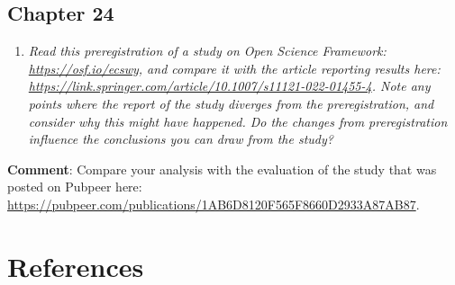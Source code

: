 \documentclass{krantz}
\providecommand{\tightlist}{%
\setlength{\itemsep}{0pt}\setlength{\parskip}{0pt}}
\begin{document}
\hypertarget{chapter-24}{%
\section{Chapter 24}\label{chapter-24}}

\begin{enumerate}
\def\labelenumi{\arabic{enumi}.}
\tightlist
\item
  \emph{Read this preregistration of a study on Open Science Framework: \url{https://osf.io/ecswy}, and compare it with the article reporting results here: \url{https://link.springer.com/article/10.1007/s11121-022-01455-4}. Note any points where the report of the study diverges from the preregistration, and consider why this might have happened. Do the changes from preregistration influence the conclusions you can draw from the study?}
\end{enumerate}

\textbf{Comment}: Compare your analysis with the evaluation of the study that was posted on Pubpeer here: \url{https://pubpeer.com/publications/1AB6D8120F565F8660D2933A87AB87}.

\hypertarget{endmatter}{%
\chapter{References}\label{endmatter}}
\end{document}
